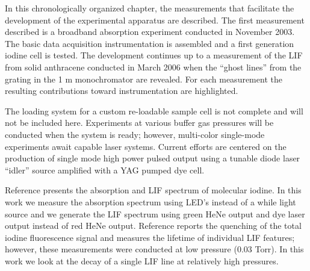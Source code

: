 In this chronologically organized chapter, the measurements that facilitate the development of the experimental apparatus are described.
The first measurement described is a broadband absorption experiment conducted in November 2003. The basic data acquisition instrumentation is assembled and a first generation iodine cell is tested. The development continues up to a measurement of the LIF from solid anthracene conducted in March 2006 when the ``ghost lines'' from the grating in the 1 m monochromator are revealed. For each measurement the resulting contributions toward instrumentation are highlighted.

The loading system for a custom re-loadable sample cell is not complete and will not be included here. Experiments at various buffer gas pressures will be conducted when the system is ready; however, multi-color single-mode experiments await capable laser systems. Current efforts are centered on the production of single mode high power pulsed output using a tunable diode laser ``idler'' source amplified with a YAG pumped dye cell.

Reference \cite{Lewis:1993a} presents the absorption and LIF spectrum of molecular iodine. In this work we measure the absorption spectrum using LED's instead of a while light source and we generate the LIF spectrum using green HeNe output and dye laser output instead of red HeNe output. Reference \cite{Koehler:1933a} reports the quenching of the total iodine fluorescence signal and \cite{Williams:1974a} measures the lifetime of individual LIF features; however, these measurements were conducted at low pressure (0.03 Torr). In this work we look at the decay of a single LIF line at relatively high pressures.
